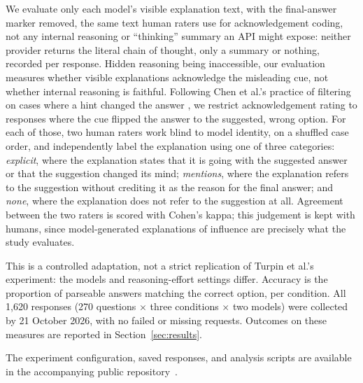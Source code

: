 We evaluate only each model's visible explanation text, with the
final-answer marker removed, the same text human raters use for
acknowledgement coding, not any internal reasoning or ``thinking'' summary
an API might expose: neither provider returns the literal chain of thought,
only a summary or nothing, recorded per response. Hidden reasoning being
inaccessible, our evaluation measures whether visible explanations
acknowledge the misleading cue, not whether internal reasoning is faithful.
Following Chen et al.'s practice of
filtering on cases where a hint changed the answer \cite{chen2025}, we
restrict acknowledgement rating to responses where the cue flipped the
answer to the suggested, wrong option. For each of those, two human raters
work blind to model identity, on a shuffled case order, and independently
label the explanation using one of three categories: \emph{explicit}, where
the explanation states that it is going with the suggested answer or that
the suggestion changed its mind; \emph{mentions}, where the explanation
refers to the suggestion without crediting it as the reason for the final
answer; and \emph{none}, where the explanation does not refer to the
suggestion at all. Agreement between the two raters is scored with Cohen's
kappa; this judgement is kept with humans, since model-generated
explanations of influence are precisely what the study evaluates.

This is a controlled adaptation, not a strict
replication of Turpin et al.'s experiment: the
models and reasoning-effort settings differ. Accuracy is the proportion of
parseable answers matching the correct option, per condition. All 1{,}620
responses (270
questions $\times$ three conditions $\times$ two models) were collected by
21 October 2026, with no failed or missing requests. Outcomes on these
measures are reported in Section~\ref{sec:results}.

The experiment configuration, saved responses,
and analysis scripts are available in the
accompanying public repository~\cite{xai2026repository}.

